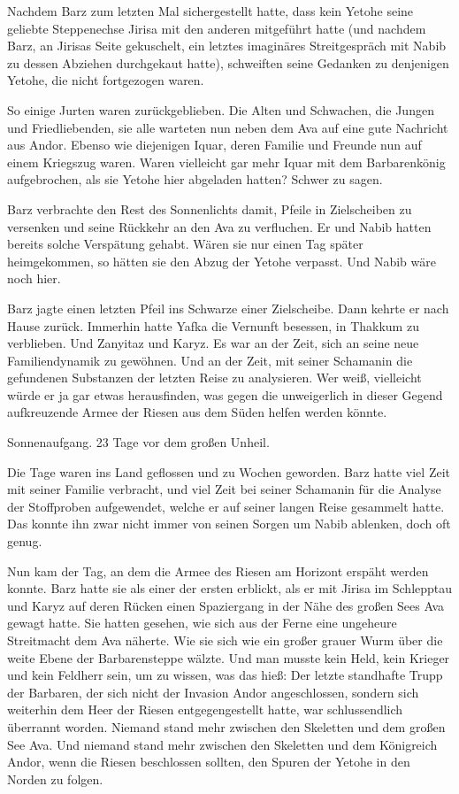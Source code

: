 Nachdem Barz zum letzten Mal sichergestellt hatte, dass kein Yetohe seine geliebte Steppenechse Jirisa mit den anderen mitgeführt hatte (und nachdem Barz, an Jirisas Seite gekuschelt, ein letztes imaginäres Streitgespräch mit Nabib zu dessen Abziehen durchgekaut hatte), schweiften seine Gedanken zu denjenigen Yetohe, die nicht fortgezogen waren.

So einige Jurten waren zurückgeblieben. Die Alten und Schwachen, die Jungen und Friedliebenden, sie alle warteten nun neben dem Ava auf eine gute Nachricht aus Andor. Ebenso wie diejenigen Iquar, deren Familie und Freunde nun auf einem Kriegszug waren. Waren vielleicht gar mehr Iquar mit dem Barbarenkönig aufgebrochen, als sie Yetohe hier abgeladen hatten? Schwer zu sagen.

Barz verbrachte den Rest des Sonnenlichts damit, Pfeile in Zielscheiben zu versenken und seine Rückkehr an den Ava zu verfluchen. Er und Nabib hatten bereits solche Verspätung gehabt. Wären sie nur einen Tag später heimgekommen, so hätten sie den Abzug der Yetohe verpasst. Und Nabib wäre noch hier.

Barz jagte einen letzten Pfeil ins Schwarze einer Zielscheibe. Dann kehrte er nach Hause zurück. Immerhin hatte Yafka die Vernunft besessen, in Thakkum zu verblieben. Und Zanyitaz und Karyz. Es war an der Zeit, sich an seine neue Familiendynamik zu gewöhnen. Und an der Zeit, mit seiner Schamanin die gefundenen Substanzen der letzten Reise zu analysieren. Wer weiß, vielleicht würde er ja gar etwas herausfinden, was gegen die unweigerlich in dieser Gegend aufkreuzende Armee der Riesen aus dem Süden helfen werden könnte.



\trennzeichen



Sonnenaufgang. 23 Tage vor dem großen Unheil.\bigskip



Die Tage waren ins Land geflossen und zu Wochen geworden. Barz hatte viel Zeit mit seiner Familie verbracht, und viel Zeit bei seiner Schamanin für die Analyse der Stoffproben aufgewendet, welche er auf seiner langen Reise gesammelt hatte. Das konnte ihn zwar nicht immer von seinen Sorgen um Nabib ablenken, doch oft genug.

Nun kam der Tag, an dem die Armee des Riesen am Horizont erspäht werden konnte. Barz hatte sie als einer der ersten erblickt, als er mit Jirisa im Schlepptau und Karyz auf deren Rücken einen Spaziergang in der Nähe des großen Sees Ava gewagt hatte. Sie hatten gesehen, wie sich aus der Ferne eine ungeheure Streitmacht dem Ava näherte. Wie sie sich wie ein großer grauer Wurm über die weite Ebene der Barbarensteppe wälzte. Und man musste kein Held, kein Krieger und kein Feldherr sein, um zu wissen, was das hieß: Der letzte standhafte Trupp der Barbaren, der sich nicht der Invasion Andor angeschlossen, sondern sich weiterhin dem Heer der Riesen entgegengestellt hatte, war schlussendlich überrannt worden. Niemand stand mehr zwischen den Skeletten und dem großen See Ava. Und niemand stand mehr zwischen den Skeletten und dem Königreich Andor, wenn die Riesen beschlossen sollten, den Spuren der Yetohe in den Norden zu folgen.

